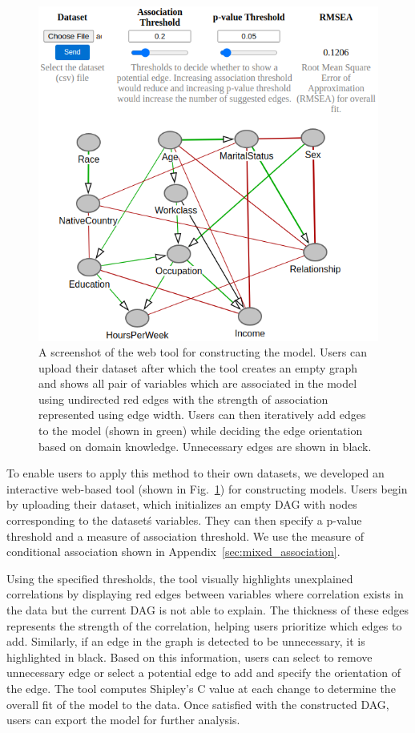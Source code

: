 \documentclass{uai2025} %
\begin{document}
\begin{figure}[t!]
	\centering
	\includegraphics[scale=0.4]{../code/plots/web_tool_full_new.png}
	\caption{A screenshot of the web tool for constructing the model. Users
		can upload their dataset after which the tool creates an empty
		graph and shows all pair of variables which are associated in
		the model using undirected red edges with the strength of
		association represented using edge width. Users can then
		iteratively add edges to the model (shown in green) while
		deciding the edge orientation based on domain knowledge.
		Unnecessary edges are shown in black.}
	\label{fig:web}
\end{figure}

To enable users to apply this method to their own datasets, we developed an
interactive web-based tool (shown in Fig.~\ref{fig:web}) for constructing
models. Users begin by uploading their dataset, which initializes an empty DAG
with nodes corresponding to the dataset\'s variables. They can then specify a
p-value threshold and a measure of association threshold. We use the measure of 
conditional association shown in Appendix~\ref{sec:mixed_association}. 

Using the specified thresholds, the tool visually highlights unexplained
correlations by displaying red edges between variables where correlation exists
in the data but the current DAG is not able to explain. The thickness of these
edges represents the strength of the correlation, helping users prioritize
which edges to add. Similarly, if an edge in the graph is detected to be
unnecessary, it is highlighted in black. Based on this information, users can
select to remove unnecessary edge or select a potential edge to add and specify
the orientation of the edge. The tool computes Shipley’s C \citep{Shipley2000}
value at each change to determine the overall fit of the model to the data.
Once satisfied with the constructed DAG, users can export the model for further
analysis.
\end{document}
